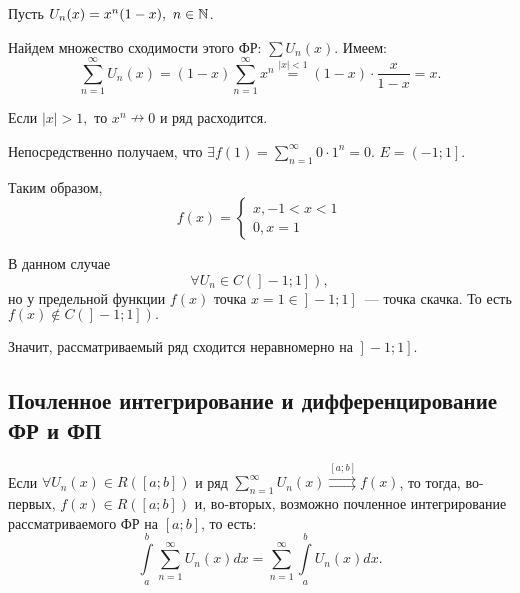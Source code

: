 \documentclass[../../main.tex]{subfiles}
\begin{document}
\begin{exmp}
	Пусть $U_n(x) = x^n(1 - x), \ n \in \mathbb{N}$.
	
	Найдем множество сходимости этого ФР: $\sum U_n(x)$. Имеем:
	\[
	\sum_{n = 1}^{\infty} U_n(x) = (1 - x)\sum_{n = 1}^{\infty} x^n \overset{|x| 
	< 1}{=} (1 - x) \cdot \frac{x}{1 - x} = x.
	\]
	
	Если $|x| > 1,$ то $x^n \nrightarrow 0$ и ряд расходится.
	
	Непосредственно получаем, что $\exists f(1) = \sum\limits_{n = 1}^{\infty} 0 
	\cdot 1^n = 0.$
	$E = \left.\left(-1; 1\right.\right].$ 
	
	Таким образом, 
	\[
	f(x) =
	\begin{cases}
	x, -1 < x < 1 \\
	0, x = 1
	\end{cases}
	\]
	
	В данном случае \[\forall U_n \in C(\left.\left.\right] -1; 1 \right]),\] но 
	у предельной функции $f(x)$ точка $x = 1 \in \left.\left.\right] -1; 1 
	\right] $~--- точка скачка.	
	То есть 
	$f(x) \notin  C(\left.\left.\right] -1; 1 \right]).$ 
	
	Значит, рассматриваемый ряд сходится неравномерно на $\left.\left.\right] -1; 
	1 \right].$
\end{exmp}


\subsection{Почленное интегрирование и дифференцирование ФР и ФП}

\begin{thm}
	Если $\forall U_n(x) \in R([a; b])$  и ряд $\sum\limits_{n = 1}^{\infty} 
	U_n(x) \overset{[a; b]}{\rightrightarrows} f(x)$, то тогда, во-первых, $f(x) 
	\in R([a; b])$ и, во-вторых, возможно почленное интегрирование 
	рассматриваемого ФР на $[a; b]$, то есть:
	\begin{equation} \label{eq:19}
	\int\limits_{a}^{b} \sum\limits_{n = 1}^{\infty}  U_n(x) dx = \sum\limits_{n 
	= 1}^{\infty}  \int\limits_{a}^{b} U_n(x) dx.
	\end{equation}
	
\end{thm}
\end{document}
